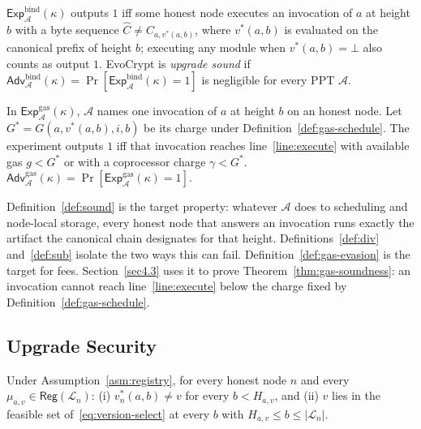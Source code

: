 \documentclass[runningheads]{llncs}
\begin{document}
\begin{definition}
\label{def:sound}
$\mathsf{Exp}^{\mathrm{bind}}_{\mathcal{A}}(\kappa)$ outputs $1$ iff some honest node executes an invocation of $a$ at height $b$ with a byte sequence $\widehat{C}\neq C_{a,v^{*}(a,b)}$, where $v^{*}(a,b)$ is evaluated on the canonical prefix of height $b$; executing any module when $v^{*}(a,b)=\bot$ also counts as output $1$. EvoCrypt is \emph{upgrade sound} if $\mathsf{Adv}^{\mathrm{bind}}_{\mathcal{A}}(\kappa)=\Pr[\mathsf{Exp}^{\mathrm{bind}}_{\mathcal{A}}(\kappa)=1]$ is negligible for every PPT $\mathcal{A}$.
\end{definition}

\begin{definition}
\label{def:gas-evasion}
In $\mathsf{Exp}^{\mathrm{gas}}_{\mathcal{A}}(\kappa)$, $\mathcal{A}$ names one invocation of $a$ at height $b$ on an honest node. Let $G^{*}=G(a,v^{*}(a,b),i,b)$ be its charge under Definition~\ref{def:gas-schedule}. The experiment outputs $1$ iff that invocation reaches line~\ref{line:execute} with available gas $g<G^{*}$ or with a coprocessor charge $\gamma<G^{*}$. $\mathsf{Adv}^{\mathrm{gas}}_{\mathcal{A}}(\kappa)=\Pr[\mathsf{Exp}^{\mathrm{gas}}_{\mathcal{A}}(\kappa)=1]$.
\end{definition}

Definition~\ref{def:sound} is the target property: whatever $\mathcal{A}$ does to scheduling and node-local storage, every honest node that answers an invocation runs exactly the artifact the canonical chain designates for that height. Definitions~\ref{def:div} and~\ref{def:sub} isolate the two ways this can fail. Definition~\ref{def:gas-evasion} is the target for fees. Section~\ref{sec4.3} uses it to prove Theorem~\ref{thm:gas-soundness}: an invocation cannot reach line~\ref{line:execute} below the charge fixed by Definition~\ref{def:gas-schedule}.

\subsection{Upgrade Security}\label{sec4.2}

\begin{lemma}
\label{lem:timeliness}
Under Assumption~\ref{asm:registry}, for every honest node $n$ and every $\mu_{a,v}\in\mathsf{Reg}(\mathcal{L}_n)$: (i) $v^{*}_{n}(a,b)\neq v$ for every $b<H_{a,v}$, and (ii) $v$ lies in the feasible set of~\eqref{eq:version-select} at every $b$ with $H_{a,v}\le b\le|\mathcal{L}_n|$.
\end{lemma}
\end{document}
